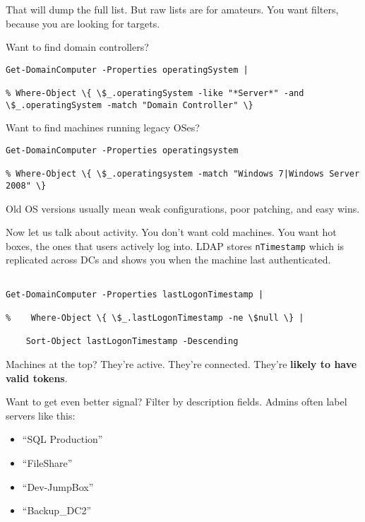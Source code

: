 That will dump the full list. But raw lists are for amateurs. You want filters, because you are looking for targets.

Want to find domain controllers?

\begin{verbatim}
Get-DomainComputer -Properties operatingSystem |

% Where-Object \{ \$_.operatingSystem -like "*Server*" -and \$_.operatingSystem -match "Domain Controller" \}
\end{verbatim}

Want to find machines running legacy OSes?
\begin{verbatim}
Get-DomainComputer -Properties operatingsystem

% Where-Object \{ \$_.operatingsystem -match "Windows 7|Windows Server 2008" \}
\end{verbatim}

Old OS versions usually mean weak configurations, poor patching, and easy wins.

Now let us talk about activity. You don’t want cold machines. You want hot boxes, the ones that users actively log into. LDAP stores \texttt{nTimestamp} which is replicated across DCs and shows you when the machine last authenticated.
\begin{verbatim}

Get-DomainComputer -Properties lastLogonTimestamp |

%    Where-Object \{ \$_.lastLogonTimestamp -ne \$null \} |

    Sort-Object lastLogonTimestamp -Descending
    \end{verbatim}
Machines at the top? They’re active. They’re connected. They’re \textbf{likely to have valid tokens}.

Want to get even better signal? Filter by description fields. Admins often label servers like this:

\begin{itemize}
    \item “SQL Production”
    \item “FileShare”
    \item “Dev-JumpBox”
    \item “Backup\_DC2”

\end{itemize}

